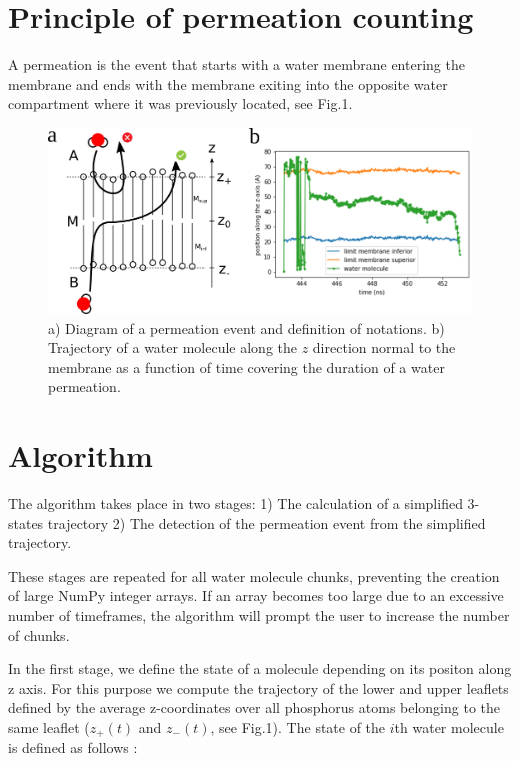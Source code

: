 \documentclass{article}
\begin{document}
\section{Principle of permeation counting}
\label{sec:comptage_permeation}

A permeation is the event that starts with a water membrane entering the membrane and ends with the membrane exiting into the opposite water compartment where it was previously located, see Fig.1.

\begin{figure}[ht]
    \centering
    \includegraphics[width=\textwidth]{images/schema_permeation.png}
    \caption[Permeation counting]{a) Diagram of a permeation event and definition of notations. b) Trajectory of a water molecule along the $z$ direction normal to the membrane as a function of time covering the duration of a water permeation.}
    \label{schema_permeation}
\end{figure}

\section{Algorithm}
\label{sec:permeation_algorithm}


The algorithm takes place in two stages:
1) The calculation of a simplified 3-states trajectory
2) The detection of the permeation event from the simplified trajectory.

These stages are repeated for all water molecule chunks, preventing the creation of large NumPy integer arrays. If an array becomes too large due to an excessive number of timeframes, the algorithm will prompt the user to increase the number of chunks.

In the first stage, we define the state of a molecule depending on its positon along z axis. For this purpose we compute the trajectory of the lower and upper leaflets defined by the average z-coordinates over all phosphorus atoms belonging to the same leaflet ($z_+(t)$ and $z_-(t)$, see Fig.1). The state of the $i$th water molecule is defined as follows :
\end{document}
